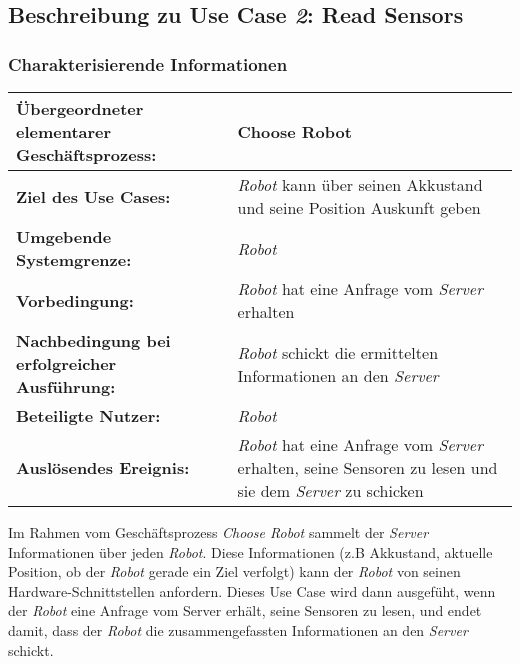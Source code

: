 			
		\pagebreak

		\subsection{Beschreibung zu Use Case \emph{2}: Read Sensors}

			\subsubsection*{Charakterisierende Informationen}

			\begin{table}[H]
				\centering
				\begin{tabularx}{\textwidth}{@{}p{5cm}X@{}}
				\toprule
				\textbf{Übergeordneter elementarer Geschäftsprozess:} & Choose Robot\\ \midrule
				\textbf{Ziel des Use Cases:} & \emph{Robot} kann über seinen Akkustand und seine Position Auskunft geben\\ \midrule
				\textbf{Umgebende Systemgrenze:} & \emph{Robot} \\ \midrule
				\textbf{Vorbedingung:} & \emph{Robot} hat eine Anfrage vom \emph{Server} erhalten \\ \midrule
				\textbf{Nachbedingung bei erfolgreicher Ausführung:} & \emph{Robot} schickt die ermittelten Informationen an den \emph{Server} \\ \midrule
				\textbf{Beteiligte Nutzer:} & \emph{Robot} \\ \midrule
				\textbf{Auslösendes Ereignis:} & \emph{Robot} hat eine Anfrage vom \emph{Server} erhalten, seine Sensoren zu lesen und sie dem \emph{Server} zu schicken \\
				\bottomrule
				\end{tabularx}
			\end{table}

			Im Rahmen vom Geschäftsprozess \emph{Choose Robot} sammelt der \emph{Server}
			Informationen über jeden \emph{Robot}. Diese Informationen (z.B
			Akkustand, aktuelle Position, ob der \emph{Robot} gerade ein Ziel verfolgt)
			kann der \emph{Robot} von seinen Hardware-Schnittstellen anfordern. Dieses
			Use Case wird dann ausgefüht, wenn der \emph{Robot} eine Anfrage vom
			Server erhält, seine Sensoren zu lesen, und endet damit, dass der \emph{Robot}
			die zusammengefassten Informationen an den \emph{Server} schickt.

